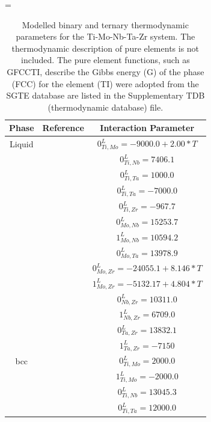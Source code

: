 \newpage
\LTcapwidth=\textwidth
\begin{longtable}[H]{ c c c }
	\caption{Modelled binary and ternary thermodynamic parameters for the Ti-Mo-Nb-Ta-Zr system. The thermodynamic description of pure elements is not included. The pure element functions, such as GFCCTI, describe the Gibbs energy (G) of the phase (FCC) for the element (TI) were adopted from the SGTE database \cite{Dinsdale1991} are listed in the Supplementary TDB (thermodynamic database) file.} \label{Ch3-table:ip}\\
		\hline
		Phase & Reference & Interaction Parameter\\
		\hline
		\endhead
		\hline
		\endfoot
		Liquid & \cite{Ansara1998} & $0^\textit{L}_{Ti,Mo} = -9000.0+2.00*T$\\
		          & \cite{Zhang2001} & $0^\textit{L}_{Ti,Nb} = 7406.1$\\
		          & \cite{Ansara1998} & $0^\textit{L}_{Ti,Ta} = 1000.0$\\
		          & \cite{Ansara1998} & $0^\textit{L}_{Ti,Ta} = -7000.0$\\
		          & \cite{Kumar1994a} & $0^\textit{L}_{Ti,Zr} = -967.7$\\
		          & \cite{Xiong2004} & $0^\textit{L}_{Mo,Nb} = 15253.7$\\
		          & \cite{Xiong2004} & $1^\textit{L}_{Mo,Nb} = 10594.2$\\
		          & \cite{Xiong2004} & $0^\textit{L}_{Mo,Ta} = 13978.9$\\
		          & \cite{Perez2003} & $0^\textit{L}_{Mo,Zr} = -24055.1+8.146*T$\\
		          & \cite{Perez2003} & $1^\textit{L}_{Mo,Zr} = -5132.17+4.804*T$\\
		          & \cite{Guillermet1991} & $0^\textit{L}_{Nb,Zr} = 10311.0$\\
		          & \cite{Guillermet1991} & $1^\textit{L}_{Nb,Zr} = 6709.0$\\
		          & \cite{Guillermet1995} & $0^\textit{L}_{Ta,Zr} = 13832.1$\\
		          & \cite{Guillermet1995} & $1^\textit{L}_{Ta,Zr} = -7150$\\
          bcc & \cite{Ansara1998} & $0^\textit{L}_{Ti,Mo} = 2000.0$\\
                  & \cite{Ansara1998} & $1^\textit{L}_{Ti,Mo} = -2000.0$\\
                  & \cite{Zhang2001} & $0^\textit{L}_{Ti,Nb} = 13045.3$\\
                  & \cite{Ansara1998} & $0^\textit{L}_{Ti,Ta} = 12000.0$\\

\end{longtable}
